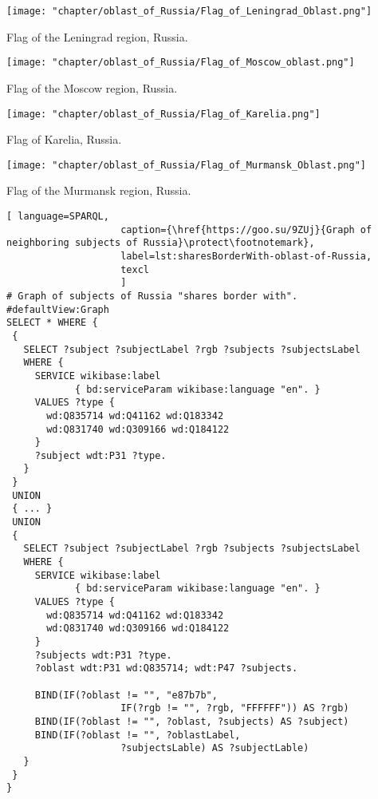 \begin{marginfigure}[1.0cm]
{
	\setlength{\fboxsep}{0pt}%
	\setlength{\fboxrule}{1pt}%
	\texttt{[image: "chapter/oblast\_of\_Russia/Flag\_of\_Leningrad\_Oblast.png"]}
}
\caption [Flag of the Leningrad region, Russia.]{Flag of the Leningrad region, Russia.}%
\label{fig:Flag_of_Leningrad_Oblast}%
\end{marginfigure}
\begin{marginfigure}[6.0cm]
{
	\setlength{\fboxsep}{0pt}%
	\setlength{\fboxrule}{1pt}%
	\texttt{[image: "chapter/oblast\_of\_Russia/Flag\_of\_Moscow\_oblast.png"]}
}
\caption [Flag of the Moscow region, Russia.]{Flag of the Moscow region, Russia.}%
\label{fig:Flag_of_Moscow_oblast}%
\end{marginfigure}
\begin{marginfigure}[11.0cm]
{
	\setlength{\fboxsep}{0pt}%
	\setlength{\fboxrule}{1pt}%
	\texttt{[image: "chapter/oblast\_of\_Russia/Flag\_of\_Karelia.png"]}
}
\caption [Flag of Karelia, Russia.]{Flag of Karelia, Russia.}%
\label{fig:Flag_of_Karelia}%
\end{marginfigure}
\begin{marginfigure}[16.0cm]
{
	\setlength{\fboxsep}{0pt}%
	\setlength{\fboxrule}{1pt}%
	\texttt{[image: "chapter/oblast\_of\_Russia/Flag\_of\_Murmansk\_Oblast.png"]}
}
\caption [Flag of the Murmansk region, Russia.]{Flag of the Murmansk region, Russia.}%
\label{fig:Flag_of_Murmansk_Oblast}%
\end{marginfigure}

\lstset{numbers=left, firstnumber=1, frame=single}
\begin{lstlisting}[ language=SPARQL, 
                    caption={\href{https://goo.su/9ZUj}{Graph of neighboring subjects of Russia}\protect\footnotemark},
                    label=lst:sharesBorderWith-oblast-of-Russia,
                    texcl 
                    ]
# Graph of subjects of Russia "shares border with". 
#defaultView:Graph
SELECT * WHERE {
 {
   SELECT ?subject ?subjectLabel ?rgb ?subjects ?subjectsLabel 
   WHERE {
     SERVICE wikibase:label 
            { bd:serviceParam wikibase:language "en". }
     VALUES ?type {
       wd:Q835714 wd:Q41162 wd:Q183342
       wd:Q831740 wd:Q309166 wd:Q184122
     }
     ?subject wdt:P31 ?type.
   }
 }
 UNION
 { ... }
 UNION
 {
   SELECT ?subject ?subjectLabel ?rgb ?subjects ?subjectsLabel 
   WHERE {
     SERVICE wikibase:label 
            { bd:serviceParam wikibase:language "en". }
     VALUES ?type {
       wd:Q835714 wd:Q41162 wd:Q183342
       wd:Q831740 wd:Q309166 wd:Q184122
     }
     ?subjects wdt:P31 ?type.
     ?oblast wdt:P31 wd:Q835714; wdt:P47 ?subjects.
     
     BIND(IF(?oblast != "", "e87b7b", 
                    IF(?rgb != "", ?rgb, "FFFFFF")) AS ?rgb)
     BIND(IF(?oblast != "", ?oblast, ?subjects) AS ?subject)
     BIND(IF(?oblast != "", ?oblastLabel, 
                    ?subjectsLable) AS ?subjectLable)
   }
 }
}
\end{lstlisting}%

